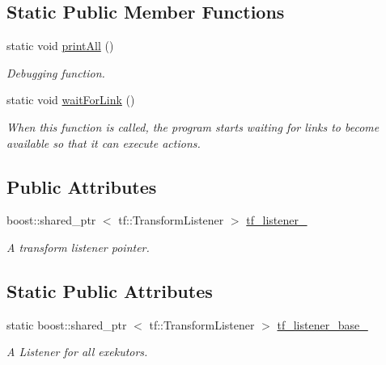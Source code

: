 \subsection*{\-Static \-Public \-Member \-Functions}
\begin{DoxyCompactItemize}
\item 
static void \hyperlink{classexekutor_1_1ActionExekutor_a7bd3c5620287a156a0edd581c6e8ccbe}{print\-All} ()
\begin{DoxyCompactList}\small\item\em \-Debugging function. \end{DoxyCompactList}\item 
static void \hyperlink{classexekutor_1_1ActionExekutor_af048b1afa2989dbd669a37a50ccc981b}{wait\-For\-Link} ()
\begin{DoxyCompactList}\small\item\em \-When this function is called, the program starts waiting for links to become available so that it can execute actions. \end{DoxyCompactList}\end{DoxyCompactItemize}
\subsection*{\-Public \-Attributes}
\begin{DoxyCompactItemize}
\item 
boost\-::shared\-\_\-ptr\*
$<$ tf\-::\-Transform\-Listener $>$ \hyperlink{classexekutor_1_1ActionExekutor_ae518bc34ee6123c118ba940fd1959f65}{tf\-\_\-listener\-\_\-}
\begin{DoxyCompactList}\small\item\em \-A transform listener pointer. \end{DoxyCompactList}\end{DoxyCompactItemize}
\subsection*{\-Static \-Public \-Attributes}
\begin{DoxyCompactItemize}
\item 
static boost\-::shared\-\_\-ptr\*
$<$ tf\-::\-Transform\-Listener $>$ \hyperlink{classexekutor_1_1ActionExekutor_aae544e9d0fdc59eb5c85b05d4af8afb8}{tf\-\_\-listener\-\_\-base\-\_\-}
\begin{DoxyCompactList}\small\item\em \-A \-Listener for all exekutors. \end{DoxyCompactList}\end{DoxyCompactItemize}
